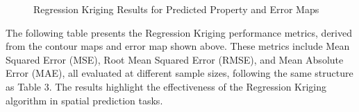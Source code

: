 \documentclass{swmcmthesis}
\begin{document}
\begin{figure}[h!t]

\caption{Regression Kriging Results for Predicted Property and Error Maps}
\label{fig:comprehensive_regression_kriging_results}
\end{figure}

\vspace{10em}

The following table presents the Regression Kriging performance metrics, derived from the contour maps and error map shown above. These metrics include Mean Squared Error (MSE), Root Mean Squared Error (RMSE), and Mean Absolute Error (MAE), all evaluated at different sample sizes, following the same structure as Table 3. The results highlight the effectiveness of the Regression Kriging algorithm in spatial prediction tasks.
\end{document}
